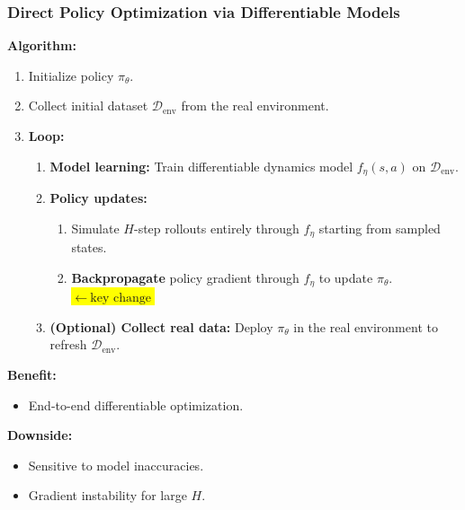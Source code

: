 \documentclass[12pt]{article}
\begin{document}
\subsubsection{Direct Policy Optimization via Differentiable Models}
\textbf{Algorithm:}
\begin{enumerate}
    \item Initialize policy $\pi_\theta$.
    \item Collect initial dataset $\mathcal{D}_{\text{env}}$ from the real environment.
    \item \textbf{Loop:}
    \begin{enumerate}
        \item \textbf{Model learning:} Train differentiable dynamics model $f_\eta(s,a)$ on $\mathcal{D}_{\text{env}}$.
        \item \textbf{Policy updates:}
        \begin{enumerate}
            \item Simulate $H$-step rollouts entirely through $f_\eta$ starting from sampled states.
            \item \textbf{Backpropagate }policy gradient through $f_\eta$ to update $\pi_\theta$. \colorbox{yellow}{\(\leftarrow\ \text{key change}\)}
        \end{enumerate}
        \item \textbf{(Optional) Collect real data:} Deploy $\pi_\theta$ in the real environment to refresh $\mathcal{D}_{\text{env}}$.
    \end{enumerate}
\end{enumerate}


\textbf{Benefit:}
\begin{itemize}
    \item End-to-end differentiable optimization.
\end{itemize}
\textbf{Downside:}
\begin{itemize}
    \item Sensitive to model inaccuracies.
    \item Gradient instability for large $H$.
\end{itemize}
\end{document}
